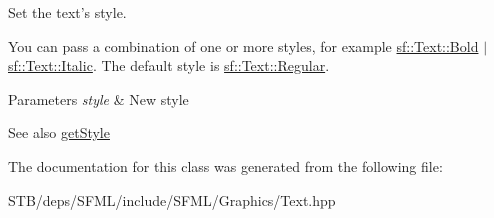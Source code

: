 Set the text's style. 

You can pass a combination of one or more styles, for example \hyperlink{classsf_1_1_text_aa8add4aef484c6e6b20faff07452bd82af1b47f98fb1e10509ba930a596987171}{sf\+::\+Text\+::\+Bold} $\vert$ \hyperlink{classsf_1_1_text_aa8add4aef484c6e6b20faff07452bd82aee249eb803848723c542c2062ebe69d8}{sf\+::\+Text\+::\+Italic}. The default style is \hyperlink{classsf_1_1_text_aa8add4aef484c6e6b20faff07452bd82a2af9ae5e1cda126570f744448e0caa32}{sf\+::\+Text\+::\+Regular}.


\begin{DoxyParams}{Parameters}
{\em style} & New style\\
\hline
\end{DoxyParams}
\begin{DoxySeeAlso}{See also}
\hyperlink{classsf_1_1_text_a3f7483a48faf66378da19d36ff6145cf}{get\+Style} 
\end{DoxySeeAlso}


The documentation for this class was generated from the following file\+:\begin{DoxyCompactItemize}
\item 
S\+T\+B/deps/\+S\+F\+M\+L/include/\+S\+F\+M\+L/\+Graphics/Text.\+hpp\end{DoxyCompactItemize}
